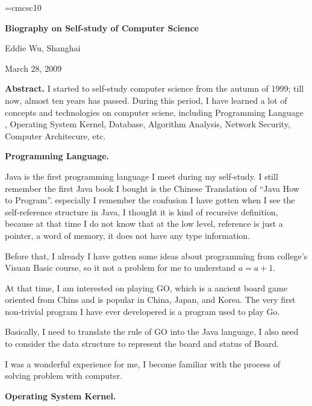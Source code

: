 \hsize=8cm
\vsize=6cm
\parskip3pt
\baselineskip14pt
\def\AW{Addison\kern.1em--Wesley}
\font\sc=cmcsc10 %


\centerline{\bf Biography on Self-study of Computer Science}
\bigskip
\centerline{Eddie Wu, Shanghai}
\bigskip
\centerline{March 28, 2009}
\bigskip
{
\baselineskip12pt

{\narrower\smallskip\noindent
{\bf Abstract.} I started to self-study computer science from the autumn of 
1999; till now, almost ten years has passed. During this period, I have
learned a lot of concepts and technologies on computer sciene, including 
Programming Language%
, Operating System Kernel, Database, Algorithm Analysis, Network Security, 
Computer Architecure, etc.
\smallskip}

}



\medskip\noindent
{\bf Programming Language.}

Java is the first programming language I meet during my self-study. I still 
remember the first Java book I bought is the Chinese Translation of ``Java How 
to Program''. especially I remember the confusion I have gotten when I see the 
self-reference structure in Java, I thought it is kind of recursive definition, 
because at that time I do not know that at 
the low level, reference is just a pointer, a word of memory, it does not have 
any type information. 

Before that, I already I have gotten some ideas about programming from college's 
Visuan Basic course, so it not a problem for me to understand $a=a+1$.

At that time, I am interested on playing GO, which is a ancient board game 
oriented from Chins and is popular in China, Japan, and Korea. The very first 
non-trivial program I have ever developered is a program used to play Go.

Basically, I need to translate the rule of GO into the Java language, I also 
need to consider the data structure to represent the board and status of Board.

I was a wonderful experience for me, I become familiar with the process of 
solving problem with computer.

\medskip\noindent
{\bf Operating System Kernel.}


